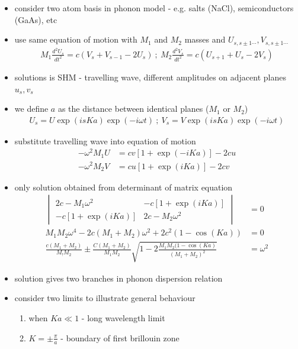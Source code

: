 \documentclass[a4paper,11pt,normalem]{article}
\begin{document}
\begin{itemize}
    \item consider two atom basis in phonon model - e.g. salts (NaCl), semiconductors (GaAs), etc
    \item use same equation of motion with \(M_1\) and \(M_2\) masses and \(U_{s,s\pm1\cdots},V_{s,s\pm1\cdots}\)
        \begin{align*}
            M_1\frac{d^2U_s}{dt^2} = c(V_s + V_{s-1} - 2U_s) ~;~ M_2\frac{d^2 V_s}{dt^2} = c(U_{s+1} + U_s - 2V_s)
        \end{align*}
    \item solutions is SHM - travelling wave, different amplitudes on adjacent planes \(u_s,v_s\)
    \item we define \(a\) as the distance between identical planes (\(M_1\) or \(M_2\))
        \begin{align*}
            U_s = U\exp(isKa)\exp(-i\omega t) ~;~ V_s = V\exp(isKa)\exp(-i\omega t)
        \end{align*}
    \item substitute travelling wave into equation of motion
        \begin{align*}
            -\omega^2 M_1U &= cv[1+\exp(-iKa)] - 2cu \\
            -\omega^2 M_2V &= cu[1+\exp(iKa)] - 2cv
        \end{align*}
    \item only solution obtained from determinant of matrix equation
        \begin{align*}
            \begin{vmatrix} 2c - M_1\omega^2 & -c[1+\exp(iKa)] \\ -c[1+\exp(iKa)] & 2c - M_2\omega^2 \end{vmatrix} &= 0 \\
            M_1M_2\omega^4 -2c(M_1+M_2)\omega^2 + 2c^2(1-\cos(Ka)) &= 0 \\
            \frac{c(M_1+M_2)}{M_!M_2} \pm \frac{C(M_1+M_2)}{M_1M_2}\sqrt{1 - 2\frac{M_1M_2(1-\cos(Ka)}{(M_1+M_2)^2}} &= \omega^2
        \end{align*}
    \item solution gives two branches in phonon dispersion relation
    \item consider two limits to illustrate general behaviour
        \begin{enumerate}
            \item when \(Ka \ll 1\) - long wavelength limit
            \item \(K = \pm\frac{\pi}{a}\) - boundary of first brillouin zone

\end{enumerate}
\end{itemize}
\end{document}
